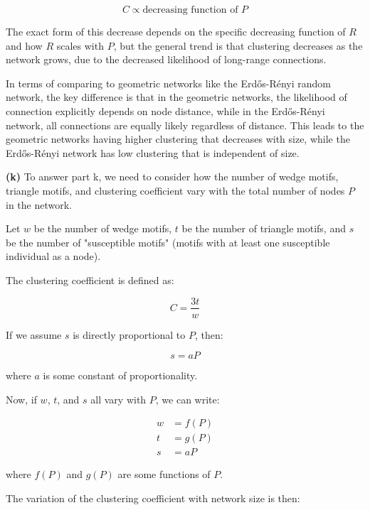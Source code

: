 \documentclass{article}
\begin{document}
\begin{equation*}
C \propto \text{decreasing function of }P
\end{equation*}

The exact form of this decrease depends on the specific decreasing function of $R$ and how $R$ scales with $P$, but the general trend is that clustering decreases as the network grows, due to the decreased likelihood of long-range connections.

In terms of comparing to geometric networks like the Erdős-Rényi random network, the key difference is that in the geometric networks, the likelihood of connection explicitly depends on node distance, while in the Erdős-Rényi network, all connections are equally likely regardless of distance. This leads to the geometric networks having higher clustering that decreases with size, while the Erdős-Rényi network has low clustering that is independent of size.


\textbf{(k)} To answer part k, we need to consider how the number of wedge motifs, triangle motifs, and clustering coefficient vary with the total number of nodes $P$ in the network.

Let $w$ be the number of wedge motifs, $t$ be the number of triangle motifs, and $s$ be the number of "susceptible motifs" (motifs with at least one susceptible individual as a node).

The clustering coefficient is defined as:

\begin{equation*}
C = \frac{3t}{w}
\end{equation*}

If we assume $s$ is directly proportional to $P$, then:

\begin{equation*}
s = aP
\end{equation*}

where $a$ is some constant of proportionality.

Now, if $w$, $t$, and $s$ all vary with $P$, we can write:

\begin{align*}
w &= f(P) \\
t &= g(P) \\
s &= aP
\end{align*}

where $f(P)$ and $g(P)$ are some functions of $P$.

The variation of the clustering coefficient with network size is then:
\end{document}

